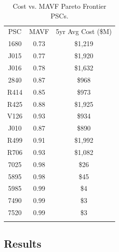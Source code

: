 \documentclass[twocolumn]{svjour3}       %
\begin{document}
\begin{table}[!htb]
  \centering
  \caption{Cost vs. MAVF Pareto Frontier PSCs.}
  \label{tab:3}       %
  \begin{tabular}{ccc}
    \hline\noalign{\smallskip}
    PSC &	MAVF & 5yr Avg Cost (\$M) \\
    \noalign{\smallskip}\hline\noalign{\smallskip}
    1680 &	0.73 &	\$1,219 \\
    J015 &	0.77 &	\$1,920 \\
    J016 &	0.78 &	\$1,632 \\
    2840 &	0.87 &	\$968 \\
    R414 &	0.85 &	\$973 \\
    R425 &	0.88 &	\$1,925 \\
    V126 &	0.93 &	\$934 \\
    J010 &	0.87 &	\$890 \\
    R499 &	0.91 &	\$1,992 \\
    R706 &	0.93 &	\$1,082 \\
    7025 &	0.98 &	\$26 \\
    5895 &	0.98 &	\$45 \\
    5985 &	0.99 &	\$4 \\
    7490 &	0.99 &	\$3 \\
    7520 &	0.99 &	\$3 \\
    \noalign{\smallskip}\hline
  \end{tabular}
\end{table}


\subsection{Results}
\label{sec:5.3}
\end{document}
